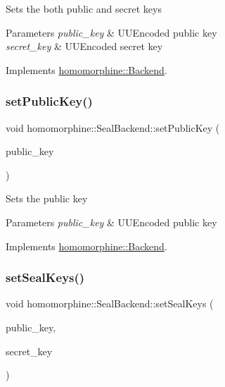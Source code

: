 Sets the both public and secret keys


\begin{DoxyParams}{Parameters}
{\em public\+\_\+key} & U\+U\+Encoded public key \\
\hline
{\em secret\+\_\+key} & U\+U\+Encoded secret key \\
\hline
\end{DoxyParams}


Implements \mbox{\hyperlink{classhomomorphine_1_1_backend_a48558b9cf1c143d92d83fa095dd84413}{homomorphine\+::\+Backend}}.

\mbox{\label{classhomomorphine_1_1_seal_backend_a6d34008acb06ff1d6743f9163fcd41fb}} 
\subsubsection{\texorpdfstring{setPublicKey()}{setPublicKey()}}
{\footnotesize\ttfamily void homomorphine\+::\+Seal\+Backend\+::set\+Public\+Key (\begin{DoxyParamCaption}\item[{string}]{public\+\_\+key }\end{DoxyParamCaption})\hspace{0.3cm}{\ttfamily [virtual]}}

Sets the public key


\begin{DoxyParams}{Parameters}
{\em public\+\_\+key} & U\+U\+Encoded public key \\
\hline
\end{DoxyParams}


Implements \mbox{\hyperlink{classhomomorphine_1_1_backend_a7c1236495e4aa6481871852edfff327a}{homomorphine\+::\+Backend}}.

\mbox{\label{classhomomorphine_1_1_seal_backend_a565461880ff401eeb2202ea5fadb8f9f}} 
\subsubsection{\texorpdfstring{setSealKeys()}{setSealKeys()}}
{\footnotesize\ttfamily void homomorphine\+::\+Seal\+Backend\+::set\+Seal\+Keys (\begin{DoxyParamCaption}\item[{Public\+Key}]{public\+\_\+key,  }\item[{Secret\+Key}]{secret\+\_\+key }\end{DoxyParamCaption})}

